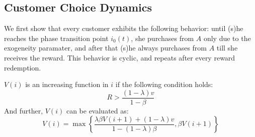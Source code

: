\subsection{Customer Choice Dynamics}
We first show that every customer exhibits the following behavior: until (s)he reaches the phase transition point $i_0(t)$, she purchases from $A$ only due to the exogeneity paramater, and after that (s)he always purchases from $A$ till she receives the reward.
This behavior is cyclic, and repeats after every reward redemption.

\begin{lemma} $V(i)$ is an increasing function in $i$ if the following condition holds:
\begin{equation}
R > \frac{(1-\lambda)v}{1-\beta}
\end{equation}
And further, $V(i)$ can be evaluated as:
\begin{equation}
V(i) = \max\left\{ \frac{\lambda \beta V(i+1)+(1-\lambda)v}{1-(1-\lambda)\beta}, \beta V(i+1) \right\}
\end{equation}
\end{lemma}


